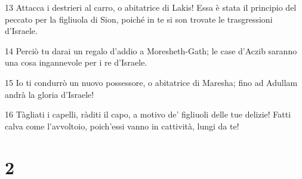 \par 13 Attacca i destrieri al carro, o abitatrice di Lakis! Essa è stata il principio del peccato per la figliuola di Sion, poiché in te si son trovate le trasgressioni d'Israele.
\par 14 Perciò tu darai un regalo d'addio a Moresheth-Gath; le case d'Aczib saranno una cosa ingannevole per i re d'Israele.
\par 15 Io ti condurrò un nuovo possessore, o abitatrice di Maresha; fino ad Adullam andrà la gloria d'Israele!
\par 16 Tàgliati i capelli, ràditi il capo, a motivo de' figliuoli delle tue delizie! Fatti calva come l'avvoltoio, poich'essi vanno in cattività, lungi da te!

\chapter{2}

